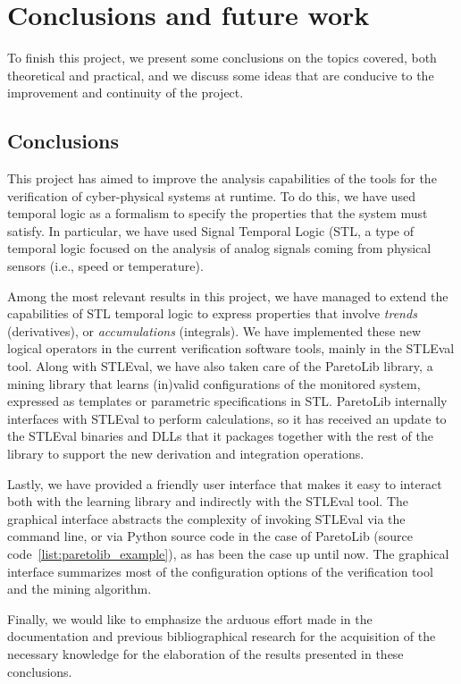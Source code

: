 \chapter{Conclusions and future work}
\label{cha:concl_en}
To finish this project, we present some conclusions on the topics covered, both theoretical and practical, and we discuss some ideas that are conducive to the improvement and continuity of the project.

\section{Conclusions}
This project has aimed to improve the analysis capabilities of the tools for the verification of cyber-physical systems at runtime. To do this, we have used temporal logic as a formalism to specify the properties that the system must satisfy. In particular, we have used Signal Temporal Logic (STL, a type of temporal logic focused on the analysis of analog signals coming from physical sensors (i.e., speed or temperature).

Among the most relevant results in this project, we have managed to extend the capabilities of STL temporal logic to express properties that involve \textit{trends} (derivatives), or \textit{accumulations} (integrals). We have implemented these new logical operators in the current verification software tools, mainly in the STLEval tool. Along with STLEval, we have also taken care of the ParetoLib library, a mining library that learns (in)valid configurations of the monitored system, expressed as templates or parametric specifications in STL. ParetoLib internally interfaces with STLEval to perform calculations, so it has received an update to the STLEval binaries and DLLs that it packages together with the rest of the library to support the new derivation and integration operations.

Lastly, we have provided a friendly user interface that makes it easy to interact both with the learning library and indirectly with the STLEval tool. The graphical interface abstracts the complexity of invoking STLEval via the command line, or via Python source code in the case of ParetoLib (source code~\ref{list:paretolib_example}), as has been the case up until now. The graphical interface summarizes most of the configuration options of the verification tool and the mining algorithm.

Finally, we would like to emphasize the arduous effort made in the documentation and previous bibliographical research for the acquisition of the necessary knowledge for the elaboration of the results presented in these conclusions.

